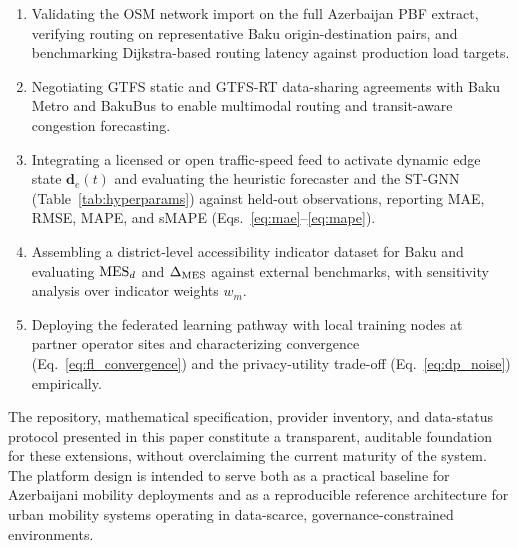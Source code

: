 \begin{enumerate}
  \item Validating the OSM network import on the full Azerbaijan PBF
        extract, verifying routing on representative Baku
        origin-destination pairs, and benchmarking Dijkstra-based routing
        latency against production load targets.
  \item Negotiating GTFS static and GTFS-RT data-sharing agreements with
        Baku Metro and BakuBus to enable multimodal routing and
        transit-aware congestion forecasting.
  \item Integrating a licensed or open traffic-speed feed to activate
        dynamic edge state $\mathbf{d}_e(t)$ and evaluating the heuristic
        forecaster and the ST-GNN (Table~\ref{tab:hyperparams}) against
        held-out observations, reporting MAE, RMSE, MAPE, and sMAPE
        (Eqs.~\ref{eq:mae}--\ref{eq:mape}).
  \item Assembling a district-level accessibility indicator dataset for
        Baku and evaluating $\mathrm{MES}_d$ and $\Delta_{\mathrm{MES}}$ against external
        benchmarks, with sensitivity analysis over indicator weights $w_m$.
  \item Deploying the federated learning pathway with local training nodes
        at partner operator sites and characterizing convergence
        (Eq.~\ref{eq:fl_convergence}) and the privacy-utility trade-off
        (Eq.~\ref{eq:dp_noise}) empirically.
\end{enumerate}

The repository, mathematical specification, provider inventory, and
data-status protocol presented in this paper constitute a transparent,
auditable foundation for these extensions, without overclaiming the
current maturity of the system.
The platform design is intended to serve both as a practical baseline
for Azerbaijani mobility deployments and as a reproducible reference
architecture for urban mobility systems operating in data-scarce,
governance-constrained environments.
